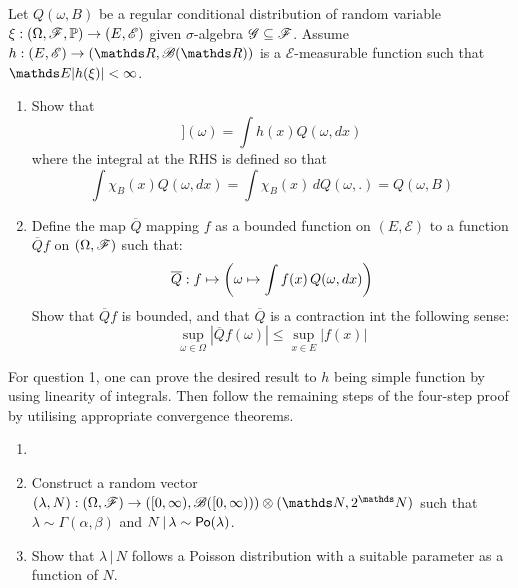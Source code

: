 \begin{unexaminable}
\begin{exercise}
Let $Q(\omega,B)$ be a regular conditional distribution of random variable $\xi: (\Omega,\mathcal{F},\mathbb{P}) \to (E,\mathcal{E})$ given $\sigma$-algebra $\mathcal{G}\subseteq\mathcal{F}$. Assume $h:(E,\mathcal{E}) \to (\R,\B(\R))$ is a $\mathcal{E}$-measurable function such that $\E|h(\xi)| < \infty$. 
\begin{enumerate}
    \item Show that
\begin{equation}
    [\E[h(\xi)\,|\,\G]](\omega) = \int h(x) Q(\omega, dx) 
\end{equation}
where the integral at the RHS is defined so that
\begin{equation}
    \int \chi_B(x) Q(\omega, dx) = \int \chi_B(x) \, dQ(\omega, .) =  Q(\omega,B)
\end{equation}
    \item Define the map $\overline{Q}$ mapping $f$ as a bounded function on $(E,\mathcal{E})$ to a function $\overline{Q}f$ on $(\Omega,\mathcal{F})$ such that:
    \begin{equation}
        \overline{Q}: f \mapsto \left( \omega \mapsto \int f(x) \, Q(\omega, dx) \right)
    \end{equation}
    Show that $\overline{Q}f$ is bounded, and that $\overline{Q}$ is a contraction int the following sense:
    \begin{equation}
        \sup_{\omega \in \Omega} |\overline{Q}f(\omega)| \leq \sup_{x \in E} |f(x)|
    \end{equation}
\end{enumerate}
\end{exercise}

\begin{hint}
For question 1, one can prove the desired result to $h$ being simple function by using linearity of integrals. Then follow the remaining steps of the four-step proof by utilising appropriate convergence theorems.
\end{hint}

\begin{exercise}
\begin{enumerate}
    \item[]
    \item Construct a random vector $(\lambda,N): (\Omega,\F) \to ([0,\infty), \B([0,\infty))) \otimes (\N, 2^\N)$ such that $\lambda \sim \Gamma(\alpha,\beta)$ and $N \,|\, \lambda \sim \mathsf{Po}(\lambda)$.
    \item Show that $\lambda \,|\, N$ follows a Poisson distribution with a suitable parameter as a function of $N$.
\end{enumerate}
\end{exercise}
\end{unexaminable}
\newpage